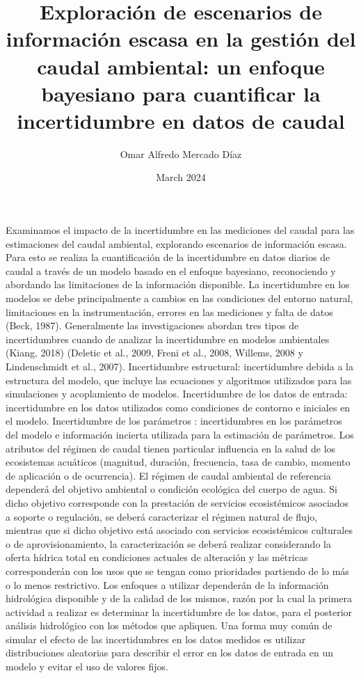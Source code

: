 \documentclass{article}
\title{\textbf{Exploración de escenarios de información escasa en la gestión del caudal ambiental: un enfoque bayesiano para cuantificar la incertidumbre en datos de caudal}}
\author{Omar Alfredo Mercado Díaz}
\date{March 2024}
\begin{document}
\maketitle
{Examinamos el impacto de la incertidumbre en las mediciones del caudal para las estimaciones del caudal ambiental, explorando escenarios de información escasa. Para esto se realiza la cuantificación de la incertidumbre en datos diarios de caudal a través de un modelo basado en el enfoque bayesiano, reconociendo y abordando las limitaciones de la información disponible. La incertidumbre en los modelos se debe principalmente a cambios en las condiciones del entorno natural, limitaciones en la instrumentación, errores en las mediciones y falta de datos (Beck, 1987). 
Generalmente las investigaciones abordan tres tipos de incertidumbres cuando de analizar la incertidumbre en modelos ambientales (Kiang, 2018) (Deletic et al., 2009, Freni et al., 2008, Willems, 2008 y Lindenschmidt et al., 2007).
Incertidumbre estructural: incertidumbre debida a la estructura del modelo, que incluye las ecuaciones y algoritmos utilizados para las simulaciones y acoplamiento de modelos.
Incertidumbre de los datos de entrada: incertidumbre en los datos utilizados como condiciones de contorno e iniciales en el modelo.
Incertidumbre de los parámetros : incertidumbres en los parámetros del modelo e información incierta utilizada para la estimación de parámetros.
Los atributos del régimen de caudal tienen particular influencia en la salud de los ecosistemas acuáticos (magnitud, duración, frecuencia, tasa de cambio, momento de aplicación o de ocurrencia). El régimen de caudal ambiental de referencia dependerá del objetivo ambiental o condición ecológica del cuerpo de agua. Si dicho objetivo corresponde con la prestación de servicios ecosistémicos asociados a soporte o regulación, se deberá caracterizar el régimen natural de flujo, mientras que si dicho objetivo está asociado con servicios ecosistémicos culturales o de aprovisionamiento, la caracterización se deberá realizar considerando la oferta hídrica total en condiciones actuales de alteración y las métricas corresponderán con los usos que se tengan como prioridades partiendo de lo más o lo menos restrictivo. Los enfoques a utilizar dependerán de la información hidrológica disponible y de la calidad de los mismos, razón por la cual la primera actividad a realizar es determinar la incertidumbre de los datos, para el posterior análisis hidrológico con los métodos que apliquen. Una forma muy común de simular el efecto de las incertidumbres en los datos medidos es utilizar distribuciones aleatorias para describir el error en los datos de entrada en un modelo y evitar el uso de valores fijos.
}
\end{document}
